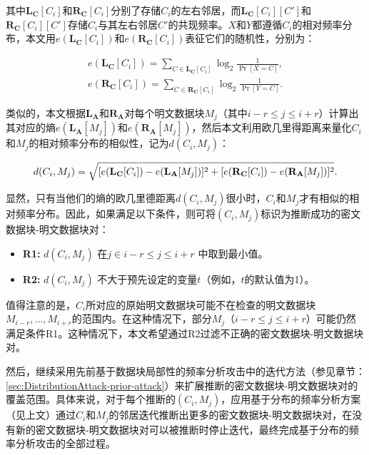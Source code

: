 其中$\mathbf{L_C}[C_i]$和$\mathbf{R_C}[C_i]$分别了存储$C_i$的左右邻居，而$\mathbf{L_C}[C_i][C']$和$\mathbf{R_C}[C_i][C']$存储$C_i$与其左右邻居$C'$的共现频率。$X$和$Y$都遵循$C_i$的相对频率分布，本文用$e(\mathbf{L_C}[C_i])$和$e(\mathbf{R_C}[C_i])$表征它们的随机性，分别为：

\begin{eqnarray*}
    e(\mathbf{L_C}[C_i]) = \sum_{C \in \mathbf{L_C}[C_i]} \log_2\frac{1}{\Pr[X = C]}, \\
    e(\mathbf{R_C}[C_i]) = \sum_{C \in \mathbf{R_C}[C_i]} \log_2\frac{1}{\Pr[Y = C]}. 
\end{eqnarray*}

类似的，本文根据$\mathbf{L_A}$和$\mathbf{R_A}$对每个明文数据块$M_j$（其中$i-r\le j\le i+r$）计算出其对应的熵$e(\mathbf{L_A}[M_j])$和$e(\mathbf{R_A}[M_j])$，然后本文利用欧几里得距离来量化$C_i$和$M_j$的相对频率分布的相似性，记为$d(C_i, M_j)$：

\begin{equation}
    \label{eq:dis-dcm}
    \centering
    d(C_i, M_j) = \sqrt{[e(\mathbf{L_C}[C_i]) - e(\mathbf{L_A}[M_j])]^2 + [e(\mathbf{R_C}[C_i]) - e(\mathbf{R_A}[M_j])]^2}.
\end{equation}

显然，只有当他们的熵的欧几里德距离$d(C_i, M_j)$很小时，$C_i$和$M_j$才有相似的相对频率分布。因此，如果满足以下条件，则可将$(C_i, M_j)$标识为推断成功的密文数据块-明文数据块对：

\begin{itemize}
\item \textbf{R1:} $d(C_i, M_j)$ 在$j \in i-r \leq j \leq i+r$ 中取到最小值。
\item \textbf{R2:} $d(C_i, M_j)$ 不大于预先设定的变量$t$（例如，$t$的默认值为1）。
\end{itemize}

值得注意的是，$C_i$所对应的原始明文数据块可能不在检查的明文数据块$M_{i-r}, \ldots, M_{i+r}$的范围内。在这种情况下，部分$M_j$（$i-r \leq j \leq i+r$）可能仍然满足条件R1。这种情况下，本文希望通过R2过滤不正确的密文数据块-明文数据块对。 

然后，继续采用先前基于数据块局部性的频率分析攻击\cite{li2017information}中的迭代方法（参见章节：\ref{sec:DistributionAttack-prior-attack}）来扩展推断的密文数据块-明文数据块对的覆盖范围。具体来说，对于每个推断的$(C_i, M_j)$，应用基于分布的频率分析方案（见上文）通过$C_i$和$M_j$的邻居迭代推断出更多的密文数据块-明文数据块对，在没有新的密文数据块-明文数据块对可以被推断时停止迭代，最终完成基于分布的频率分析攻击的全部过程。

